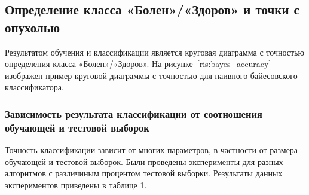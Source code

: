
\subsection{Определение класса «Болен»/«Здоров» и точки с опухолью}
Результатом обучения и классификации является круговая диаграмма с точностью определения класса «Болен»/«Здоров». На рисунке~\ref{ris:bayes_accuracy} изображен пример круговой диаграммы с точностью для наивного байесовского классификатора.
\par
\subsubsection{Зависимость результата классификации от соотношения обучающей и тестовой выборок}
Точность классификации зависит от многих параметров, в частности от размера обучающей и тестовой выборок. Были проведены эксперименты для разных алгоритмов с различиным процентом тестовой выборки. Результаты данных экспериментов приведены в таблице 1.
